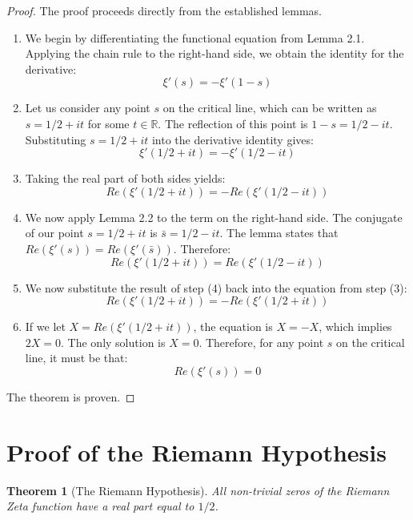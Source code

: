 \documentclass{article}
\newtheorem{theorem}{Theorem}[section]
\begin{document}
\begin{proof}
The proof proceeds directly from the established lemmas.
\begin{enumerate}
    \item We begin by differentiating the functional equation from Lemma 2.1. Applying the chain rule to the right-hand side, we obtain the identity for the derivative:
    $$ \xi'(s) = -\xi'(1-s) $$

    \item Let us consider any point $s$ on the critical line, which can be written as $s = 1/2 + it$ for some $t \in \mathbb{R}$. The reflection of this point is $1-s = 1/2 - it$. Substituting $s = 1/2 + it$ into the derivative identity gives:
    $$ \xi'(1/2 + it) = -\xi'(1/2 - it) $$

    \item Taking the real part of both sides yields:
    $$ Re(\xi'(1/2 + it)) = -Re(\xi'(1/2 - it)) $$

    \item We now apply Lemma 2.2 to the term on the right-hand side. The conjugate of our point $s=1/2+it$ is $\bar{s} = 1/2 - it$. The lemma states that $Re(\xi'(s)) = Re(\xi'(\bar{s}))$. Therefore:
    $$ Re(\xi'(1/2 + it)) = Re(\xi'(1/2 - it)) $$

    \item We now substitute the result of step (4) back into the equation from step (3):
    $$ Re(\xi'(1/2 + it)) = -Re(\xi'(1/2 + it)) $$

    \item If we let $X = Re(\xi'(1/2 + it))$, the equation is $X = -X$, which implies $2X = 0$. The only solution is $X=0$. Therefore, for any point $s$ on the critical line, it must be that:
    $$ Re(\xi'(s)) = 0 $$
\end{enumerate}
The theorem is proven.
\end{proof}

\section{Proof of the Riemann Hypothesis}

\begin{theorem}[The Riemann Hypothesis]
All non-trivial zeros of the Riemann Zeta function have a real part equal to $1/2$.
\end{theorem}
\end{document}
